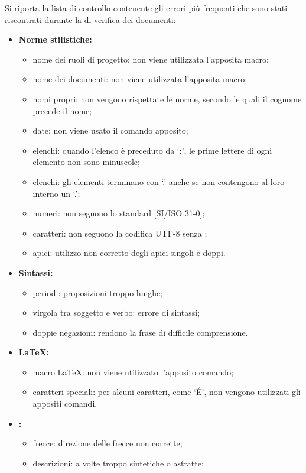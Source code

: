 Si riporta la lista di controllo contenente gli errori più frequenti che sono stati riscontrati durante la  di verifica dei documenti:
\begin{itemize}
	\item \textbf{Norme stilistiche:}
	\begin{itemize}
		\item nome dei ruoli di progetto: non viene utilizzata l'apposita macro;
		\item nome dei documenti: non viene utilizzata l'apposita macro;
		\item nomi propri: non vengono rispettate le norme, secondo le quali il cognome precede il nome;
		\item date: non viene usato il comando apposito;
		\item elenchi: quando l'elenco è preceduto da ‘:’, le prime lettere di ogni elemento non sono minuscole;
		\item elenchi: gli elementi terminano con ‘.’ anche se non contengono al loro interno un ‘.’;
		\item numeri: non seguono lo standard [SI/ISO 31-0];
		\item caratteri: non seguono la codifica UTF-8 senza ;
		\item apici: utilizzo non corretto degli apici singoli e doppi.
	\end{itemize}
	\item \textbf{Sintassi:}
	\begin{itemize}
		\item periodi: proposizioni troppo lunghe;
		\item virgola tra soggetto e verbo: errore di sintassi;
		\item doppie negazioni: rendono la frase di difficile comprensione.
	\end{itemize}
	\item \textbf{\LaTeX{}:}
	\begin{itemize}
		\item macro \LaTeX{}: non viene utilizzato l'apposito comando;
		\item caratteri speciali: per alcuni caratteri, come ‘\'{E}’, non vengono utilizzati gli appositi comandi.
	\end{itemize}
	\item \textbf{:}
	\begin{itemize}
		\item frecce: direzione delle frecce non corrette;
		\item descrizioni: a volte troppo sintetiche o astratte;

\end{itemize}
\end{itemize}
